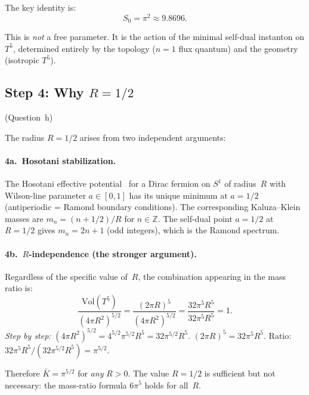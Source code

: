 \documentclass[11pt,a4paper]{article}
\theoremstyle{definition}
\theoremstyle{remark}
\begin{document}
The key identity is:
\begin{equation}
  \boxed{S_0 = \pi^2 \approx 9.8696.}
\end{equation}

This is \emph{not} a free parameter.  It is the action of the minimal
self-dual instanton on $T^5$, determined entirely by the topology
($n=1$ flux quantum) and the geometry (isotropic $T^5$).

\subsection{Step 4: Why $R = 1/2$}
\label{app:step4}

(Question~h)

The radius $R=1/2$ arises from two independent arguments:

\paragraph{4a.\ Hosotani stabilization.}
The Hosotani effective potential~\cite{Hosotani1983,Hosotani1989}
for a Dirac fermion on $S^1$ of radius~$R$ with Wilson-line
parameter $a \in [0,1]$ has its unique minimum at $a = 1/2$
(antiperiodic = Ramond boundary conditions).
The corresponding Kaluza--Klein masses are
$m_n = (n + 1/2)/R$ for $n \in \mathbb{Z}$.
The self-dual point $a = 1/2$ at $R = 1/2$ gives
$m_n = 2n + 1$ (odd integers), which is the Ramond spectrum.

\paragraph{4b.\ $R$-independence (the stronger argument).}
Regardless of the specific value of~$R$, the combination
appearing in the mass ratio is:
\begin{equation}
  \frac{\mathrm{Vol}(T^5)}{(4\pi R^2)^{5/2}}
  = \frac{(2\pi R)^5}{(4\pi R^2)^{5/2}}
  = \frac{32\pi^5 R^5}{32\pi^5 R^5}
  = 1.
\end{equation}
\emph{Step by step:}
$(4\pi R^2)^{5/2} = 4^{5/2} \pi^{5/2} R^5 = 32 \pi^{5/2} R^5$.
$(2\pi R)^5 = 32 \pi^5 R^5$.
Ratio: $32\pi^5 R^5 / (32\pi^{5/2} R^5) = \pi^{5/2}$.

Therefore $\bar K = \pi^{5/2}$ for \emph{any} $R > 0$.
The value $R = 1/2$ is sufficient but not necessary:
the mass-ratio formula $6\pi^5$ holds for all~$R$.
\end{document}

